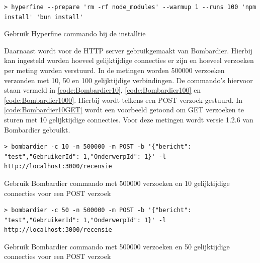 \begin{listing}[H]
  \centering
  \begin{verbatim}
> hyperfine --prepare 'rm -rf node_modules' --warmup 1 --runs 100 'npm install' 'bun install'
      \end{verbatim}
      \caption[Gebruik Hyperfine bij de installatie]{\label{code:HyperfineInstall}Gebruik Hyperfine commando bij de installtie}
\end{listing}
Daarnaast wordt voor de HTTP server gebruikgemaakt van Bombardier. 
Hierbij kan ingesteld worden hoeveel gelijktijdige connecties er zijn en hoeveel verzoeken per meting worden verstuurd.
In de metingen worden 500000 verzoeken verzonden met 10, 50 en 100 gelijktijdige verbindingen.
De commando's hiervoor staan vermeld in \ref{code:Bombardier10}, \ref{code:Bombardier100} en \ref{code:Bombardier1000}.
Hierbij wordt telkens een POST verzoek gestuurd. 
In \ref{code:Bombardier10GET} wordt een voorbeeld getoond om GET verzoeken te sturen met 10 gelijktijdige connecties.
Voor deze metingen wordt versie 1.2.6 van Bombardier gebruikt.
\begin{listing}[H]
  \centering
  \begin{verbatim}
> bombardier -c 10 -n 500000 -m POST -b '{"bericht": "test","GebruikerId": 1,"OnderwerpId": 1}' -l http://localhost:3000/recensie
      \end{verbatim}
      \caption[Gebruik Bombardier POST verzoek met 10 connecties]{\label{code:Bombardier10}Gebruik Bombardier commando met 500000 verzoeken en 10 gelijktijdige connecties voor een POST verzoek}
\end{listing}
\begin{listing}[H]
  \centering
  \begin{verbatim}
> bombardier -c 50 -n 500000 -m POST -b '{"bericht": "test","GebruikerId": 1,"OnderwerpId": 1}' -l http://localhost:3000/recensie
      \end{verbatim}
      \caption[Gebruik Bombardier POST verzoek met 50 connecties]{\label{code:Bombardier100}Gebruik Bombardier commando met 500000 verzoeken en 50 gelijktijdige connecties voor een POST verzoek}
\end{listing}
